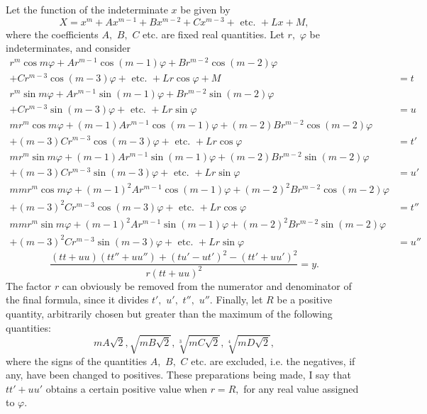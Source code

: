 \documentclass[12pt]{memoir}
\theoremstyle{plain}
\theoremstyle{remark}
\begin{document}
Let the function of the indeterminate \(x\) be given by
\[X = x^m + Ax^{m-1} + Bx^{m-2} + Cx^{m-3} + \text{ etc. } + Lx + M,\]
where the coefficients \(A,\) \(B,\) \(C\) etc. are fixed real quantities. Let \(r,\) \(\varphi\) be indeterminates, and consider
\[\begin{array}{rl}
r^m\cos m\varphi + A r^{m-1}\cos(m-1)\varphi + Br^{m-2}\cos(m-2)\varphi & \\
+ Cr^{m-3}\cos(m-3)\varphi + \text{ etc. } + Lr\cos\varphi + M &= t\\
r^m\sin m\varphi + Ar^{m-1}\sin(m-1)\varphi + Br^{m-2}\sin(m-2)\varphi & \\
+ Cr^{m-3}\sin(m-3)\varphi + \text{ etc. } + Lr\sin\varphi &= u\\
mr^m\cos m\varphi +(m-1)Ar^{m-1}\cos(m-1)\varphi+(m-2)Br^{m-2}\cos(m-2)\varphi &\\
+ (m-3)Cr^{m-3}\cos(m-3)\varphi + \text{ etc. } + Lr\cos\varphi &= t'\\
mr^m\sin m\varphi +(m-1)Ar^{m-1}\sin(m-1)\varphi + (m-2)Br^{m-2}\sin(m-2)\varphi &\\
+ (m-3)Cr^{m-3}\sin(m-3)\varphi + \text{ etc. } + Lr\sin\varphi &= u'\\
mmr^m\cos m\varphi+(m-1)^2Ar^{m-1}\cos(m-1)\varphi+(m-2)^2Br^{m-2}\cos(m-2)\varphi &\\
+ (m-3)^2Cr^{m-3}\cos(m-3)\varphi + \text{ etc. } + Lr\cos \varphi &= t''\\
mmr^m\sin m\varphi+(m-1)^2Ar^{m-1}\sin(m-1)\varphi+(m-2)^2Br^{m-2}\sin(m-2)\varphi &\\
+ (m-3)^2Cr^{m-3}\sin(m-3)\varphi + \text{ etc. } + Lr\sin\varphi &= u''
\end{array}\]
\[\frac{(tt+uu)(tt''+uu'')+(tu'-ut')^2-(tt'+uu')^2}{r(tt+uu)^2} = y.\]
The factor \(r\) can obviously be removed from the numerator and denominator of the final formula,  since it divides \(t',\) \(u',\) \(t'',\) \(u''\). Finally, let \(R\) be a positive quantity, arbitrarily chosen but greater than the maximum of the following quantities:
\[mA\sqrt{2}, \sqrt{mB\sqrt{2}}, \sqrt[3]{mC\sqrt{2}}, \sqrt[4]{mD\sqrt{2}},\]
where the signs of the quantities \(A,\) \(B,\) \(C\) etc. are excluded, i.e. the negatives, if any, have been changed to positives. These preparations being made, I say that \(tt'+uu'\) obtains a certain positive value when \(r = R,\) for any real value assigned to \(\varphi.\)
\end{document}
